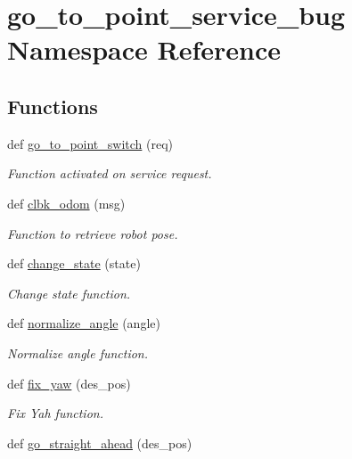 \hypertarget{namespacego__to__point__service__bug}{}\section{go\+\_\+to\+\_\+point\+\_\+service\+\_\+bug Namespace Reference}
\label{namespacego__to__point__service__bug}
\subsection*{Functions}
\begin{DoxyCompactItemize}
\item 
def \hyperlink{namespacego__to__point__service__bug_a66835918820d392cf39cc1e3b28497ee}{go\+\_\+to\+\_\+point\+\_\+switch} (req)
\begin{DoxyCompactList}\small\item\em Function activated on service request. \end{DoxyCompactList}\item 
def \hyperlink{namespacego__to__point__service__bug_acc2367a3fc6946e8ea518d82a018dcd7}{clbk\+\_\+odom} (msg)
\begin{DoxyCompactList}\small\item\em Function to retrieve robot pose. \end{DoxyCompactList}\item 
def \hyperlink{namespacego__to__point__service__bug_a99587ca3714f1c59523a0fccdb4acc7d}{change\+\_\+state} (state)
\begin{DoxyCompactList}\small\item\em Change state function. \end{DoxyCompactList}\item 
def \hyperlink{namespacego__to__point__service__bug_a3ff83aec5e0de49fa33f2d33681d2a49}{normalize\+\_\+angle} (angle)
\begin{DoxyCompactList}\small\item\em Normalize angle function. \end{DoxyCompactList}\item 
def \hyperlink{namespacego__to__point__service__bug_a0f4f965c49e3e20c6442b10bf41e2533}{fix\+\_\+yaw} (des\+\_\+pos)
\begin{DoxyCompactList}\small\item\em Fix Yah function. \end{DoxyCompactList}\item 
def \hyperlink{namespacego__to__point__service__bug_a78a4659fd178f90a4b0acb3a4da0fbc1}{go\+\_\+straight\+\_\+ahead} (des\+\_\+pos)

\end{DoxyCompactItemize}
